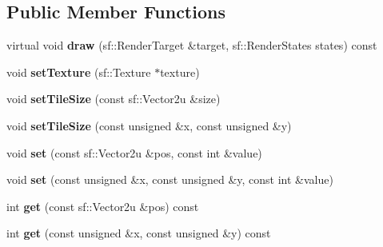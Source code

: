\subsection*{Public Member Functions}
\begin{DoxyCompactItemize}
\item 
\mbox{\label{class_dolly_1_1_containers_1_1_tilemap_aba0606e63af9bafc6d75148750f22780}} 
virtual void {\bfseries draw} (sf\+::\+Render\+Target \&target, sf\+::\+Render\+States states) const
\item 
\mbox{\label{class_dolly_1_1_containers_1_1_tilemap_aead04d7c6115849dcd1a4bb691bfde4e}} 
void {\bfseries set\+Texture} (sf\+::\+Texture $\ast$texture)
\item 
\mbox{\label{class_dolly_1_1_containers_1_1_tilemap_aa8fde596c3ec6588e4b5b5c5934f94c4}} 
void {\bfseries set\+Tile\+Size} (const sf\+::\+Vector2u \&size)
\item 
\mbox{\label{class_dolly_1_1_containers_1_1_tilemap_a030d495587078ec6bf7c8c2b186c4f4d}} 
void {\bfseries set\+Tile\+Size} (const unsigned \&x, const unsigned \&y)
\item 
\mbox{\label{class_dolly_1_1_containers_1_1_tilemap_a76a367167d4ddc77050b8f2a936428f3}} 
void {\bfseries set} (const sf\+::\+Vector2u \&pos, const int \&value)
\item 
\mbox{\label{class_dolly_1_1_containers_1_1_tilemap_a47b502286e8afdb3d8c57431f1a97e28}} 
void {\bfseries set} (const unsigned \&x, const unsigned \&y, const int \&value)
\item 
\mbox{\label{class_dolly_1_1_containers_1_1_tilemap_aa436a7f25741e5a2fe94d55fb5e2c454}} 
int {\bfseries get} (const sf\+::\+Vector2u \&pos) const
\item 
\mbox{\label{class_dolly_1_1_containers_1_1_tilemap_a4d7d52c88582e98907d076d15bc94412}} 
int {\bfseries get} (const unsigned \&x, const unsigned \&y) const

\end{DoxyCompactItemize}

